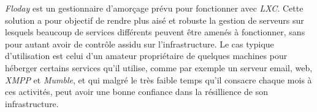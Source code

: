 \emph{Floday} est un gestionnaire d'amorçage prévu pour fonctionner avec \emph{LXC}.
Cette solution a pour objectif de rendre plus aisé et robuste la gestion de serveurs sur lesquels beaucoup de services différents peuvent être amenés à fonctionner, sans pour autant avoir de contrôle assidu sur l'infrastructure.
Le cas typique d'utilisation est celui d'un amateur propriétaire de quelques machines pour héberger certains services qu'il utilise, comme par exemple un serveur email, web, \emph{XMPP} et \emph{Mumble}, et qui malgré le très faible temps qu'il consacre chaque mois à ces activités, peut avoir une bonne confiance dans la résillience de son infrastructure.
